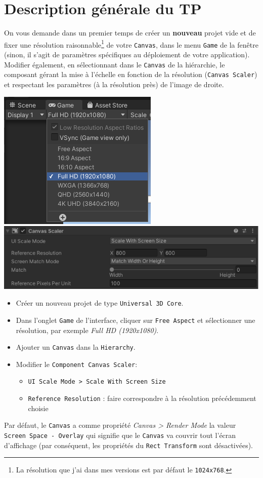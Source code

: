 \documentclass[a4paper,10pt]{article}
\newenvironment{solution}%
{\begin{tcolorbox}[breakable,colback=red!5!white,colframe=red!75!black,title=Solution]}%
{\end{tcolorbox}}
\begin{document}
\section*{Description générale du TP}


On vous demande dans un premier temps de créer un \textbf{nouveau} projet vide et de fixer une résolution raisonnable\footnote{La résolution que j'ai dans mes versions est par défaut le \texttt{1024x768}.} de votre \texttt{Canvas}, dans le menu \texttt{Game} de la fenêtre (sinon, il s'agit de paramètres spécifiques au déploiement de votre application). Modifier également, en sélectionnant dans le \texttt{Canvas} de la hiérarchie, le composant gérant la mise à l'échelle en fonction de la résolution (\texttt{Canvas Scaler}) et respectant les paramètres (à la résolution près) de l'image de droite.

\begin{center}
\hfill	\includegraphics[width=0.3\linewidth]{fig/unity_set_ui_resolution_game}%
\hfill	\includegraphics[width=0.6\linewidth]{fig/unity_set_ui_resolution_canvas_scaler}%
\hfill
\end{center}

\ifversionenseignant
\begin{solution}
	\begin{itemize}
		\item Créer un nouveau projet de type \texttt{Universal 3D Core}.
		\item Dans l'onglet \texttt{Game} de l'interface, cliquer sur \texttt{Free Aspect} et sélectionner une résolution, par exemple \textit{Full HD (1920x1080)}.
		\item Ajouter un \texttt{Canvas} dans la \texttt{Hierarchy}.
		\item Modifier le \texttt{Component Canvas Scaler}:
		\begin{itemize}
			\item \texttt{UI Scale Mode > Scale With Screen Size}
			\item \texttt{Reference Resolution} : faire correspondre à la résolution précédemment choisie
		\end{itemize}
	\end{itemize}

Par défaut, le \texttt{Canvas} a comme propriété \textit{Canvas > Render Mode} la valeur \texttt{Screen Space - Overlay} qui signifie que le \texttt{Canvas} va couvrir tout l'écran d'affichage (par conséquent, les propriétés du \texttt{Rect Transform} sont désactivées).
\end{solution}
\fi 
\end{document}

